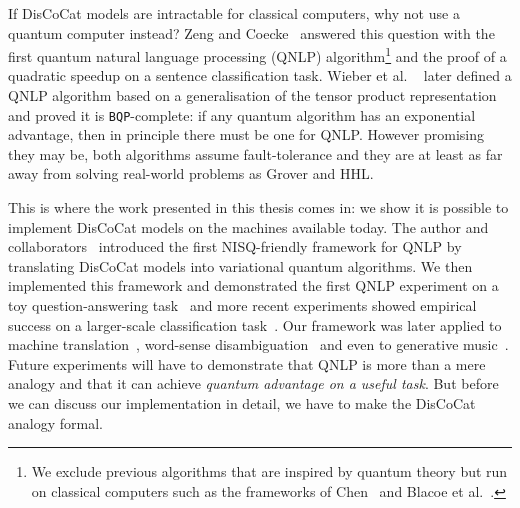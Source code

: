 If DisCoCat models are intractable for classical computers, why not use a quantum computer instead?
Zeng and Coecke~\cite{ZengCoecke16} answered this question with the first quantum natural language processing (QNLP) algorithm\footnote
{We exclude previous algorithms that are inspired by quantum theory but run on classical computers such as the frameworks of Chen~\cite{Chen02} and Blacoe et al.~\cite{BlacoeEtAl13}.}
and the proof of a quadratic speedup on a sentence classification task.
Wieber et al. ~\cite{WiebeEtAl19} later defined a QNLP algorithm based on a generalisation of the tensor product representation and proved it is \texttt{BQP}-complete: if any quantum algorithm has an exponential advantage, then in principle there must be one for QNLP.
However promising they may be, both algorithms assume fault-tolerance and they are at least as far away from solving real-world problems as Grover and HHL.

This is where the work presented in this thesis comes in: we show it is possible to implement DisCoCat models on the machines available today.
The author and collaborators~\cite{MeichanetzidisEtAl20a,CoeckeEtAl20} introduced the first NISQ-friendly framework for QNLP by translating DisCoCat models into variational quantum algorithms.
We then implemented this framework and demonstrated the first QNLP experiment on a toy question-answering task~\cite{MeichanetzidisEtAl20} and more recent experiments showed empirical success on a larger-scale classification task~\cite{LorenzEtAl21}.
Our framework was later applied to machine translation~\cite{AbbaszadeEtAl21,VicenteNieto21}, word-sense disambiguation~\cite{Hoffmann21} and even to generative music~\cite{MirandaEtAl21}.
Future experiments will have to demonstrate that QNLP is more than a mere analogy and that it can achieve \emph{quantum advantage on a useful task}.
But before we can discuss our implementation in detail, we have to make the DisCoCat analogy formal.
